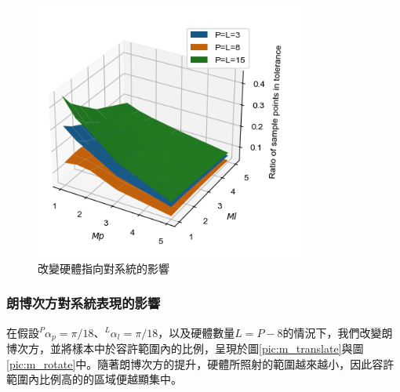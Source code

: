 \begin{figure}[h!]
    \centering
    \includegraphics[width=9cm]{ch4pic/m_effect.png}
    \caption{改變硬體指向對系統的影響}
    \label{pic:alpha_effect}
\end{figure}

\subsubsection{朗博次方對系統表現的影響}
\label{chp:m_effect}

在假設$^P\alpha_p =\pi/18$、$^L\alpha_l = \pi/18$，以及硬體數量$L=P-8$的情況下，我們改變朗博次方，並將樣本中於容許範圍內的比例，呈現於圖\ref{pic:m_translate}與圖\ref{pic:m_rotate}中。隨著朗博次方的提升，硬體所照射的範圍越來越小，因此容許範圍內比例高的的區域便越顯集中。

